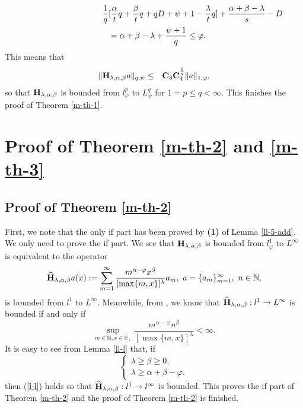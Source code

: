 \documentclass[10pt]{amsart}
\theoremstyle{definition}    %
\numberwithin{equation}{section}
\begin{document}
\begin{eqnarray}
\lefteqn{\frac{1}{q}[\frac{\alpha}{t}q+\frac{\beta}{t}q+qD+\psi+1-\frac{\lambda}{t}q]+\frac{\alpha+\beta-\lambda}{s}-D}\nonumber \\
&&=\alpha+\beta-\lambda+\frac{\psi+1}{q}\leq \varphi.  \nonumber
\end{eqnarray}
This means that \begin{eqnarray}
\|{\bf H}_{\lambda, \alpha, \beta}a\|_{q, \psi}&\leq& {\bf C}_3{\bf C}_4^{\frac{1}{q}}\|a\|_{1, \varphi}, \nonumber
\end{eqnarray}
so that ${\bf H}_{\lambda, \alpha, \beta}$ is bounded from $l_{\varphi}^{p}$ to $L_{\psi}^{q}$ for $1=p\leq q<\infty$. This finishes the proof of Theorem \ref{m-th-1}.

\section{{\bf Proof of Theorem \ref{m-th-2} and \ref{m-th-3}}}
\subsection{\bf Proof of Theorem \ref{m-th-2} }First, we note that the only if part has been proved by {\bf (1)} of Lemma \ref{ll-5-add}. We only need to prove the if part. We see that  ${\bf H}_{\lambda, \alpha, \beta}$ is bounded from $l_{\varphi}^1$ to $L^{\infty}$ is equivalent to the operator 
$$\widehat{{\bf H}}_{\lambda, \alpha, \beta}a(x):=\sum_{m=1}^{\infty} \frac{m^{\alpha-\varphi}x^{\beta}}{[\max\{m,x\}]^{\lambda}}a_m,\,\, a=\{a_m\}_{m=1}^{\infty}, \,\, n\in \mathbb{N},$$
is bounded from $l^1$ to $L^{\infty}$. Meanwhile, from \cite[Proposition 5.4]{Tao}, we know that $\widehat{{\bf H}}_{\lambda, \alpha, \beta}: l^1\rightarrow L^{\infty}$ is bounded if and only if  
\begin{equation}\label{l-l}\sup_{m\in \mathbb{N},x\in \mathbb{R}_{+}}\frac{m^{\alpha-\varphi}n^{\beta}}{[\max\{m,x\}]^{\lambda}}<\infty.\end{equation}
It is easy to see from Lemma \ref{ll-l} that, if \begin{equation}\label{th-2-1}
\begin{cases}
\lambda\geq \beta\geq 0, \\
\lambda\geq \alpha+\beta-\varphi.\nonumber
\end{cases}
\end{equation}
then (\ref{l-l}) holds so that $\widehat{{\bf H}}_{\lambda, \alpha, \beta}: l^1\rightarrow l^{\infty}$ is bounded. This proves the if part of Theorem \ref{m-th-2} and the proof of Theorem \ref{m-th-2} is finished.
\end{document}
